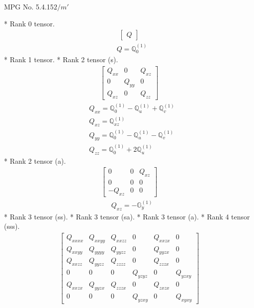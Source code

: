 \documentclass[fleqn,8pt,landscape]{jsarticle}
\begin{document}
\setcounter{MaxMatrixCols}{32}

\renewcommand{\tablename}{Table~}
\renewcommand{\figurename}{Figure~}
\begin{center}
\LARGE
MPG No. 5.4.15\quad$2/m'$
\end{center}
* Rank 0 tensor.
\begin{align*}
\begin{bmatrix} Q \end{bmatrix}
\end{align*}
\begin{align*}
& Q = \mathbb{Q}_{0}^{(1)}
\end{align*}
* Rank 1 tensor.
* Rank 2 tensor (s).
\begin{align*}
\begin{bmatrix} Q_{xx} & 0 & Q_{xz} \\ 0 & Q_{yy} & 0 \\ Q_{xz} & 0 & Q_{zz} \end{bmatrix}
\end{align*}
\begin{align*}
& Q_{xx} = \mathbb{Q}_{0}^{(1)} - \mathbb{Q}_{u}^{(1)} + \mathbb{Q}_{v}^{(1)} \\
& Q_{xz} = \mathbb{Q}_{xz}^{(1)} \\
& Q_{yy} = \mathbb{Q}_{0}^{(1)} - \mathbb{Q}_{u}^{(1)} - \mathbb{Q}_{v}^{(1)} \\
& Q_{zz} = \mathbb{Q}_{0}^{(1)} + 2 \mathbb{Q}_{u}^{(1)}
\end{align*}
* Rank 2 tensor (a).
\begin{align*}
\begin{bmatrix} 0 & 0 & Q_{xz} \\ 0 & 0 & 0 \\ - Q_{xz} & 0 & 0 \end{bmatrix}
\end{align*}
\begin{align*}
& Q_{xz} = - \mathbb{G}_{y}^{(1)}
\end{align*}
* Rank 3 tensor (ss).
* Rank 3 tensor (sa).
* Rank 3 tensor (a).
* Rank 4 tensor (sss).
\begin{align*}
\begin{bmatrix} Q_{xxxx} & Q_{xxyy} & Q_{xxzz} & 0 & Q_{xxzx} & 0 \\ Q_{xxyy} & Q_{yyyy} & Q_{yyzz} & 0 & Q_{yyzx} & 0 \\ Q_{xxzz} & Q_{yyzz} & Q_{zzzz} & 0 & Q_{zzzx} & 0 \\ 0 & 0 & 0 & Q_{yzyz} & 0 & Q_{yzxy} \\ Q_{xxzx} & Q_{yyzx} & Q_{zzzx} & 0 & Q_{zxzx} & 0 \\ 0 & 0 & 0 & Q_{yzxy} & 0 & Q_{xyxy} \end{bmatrix}
\end{align*}
\end{document}
